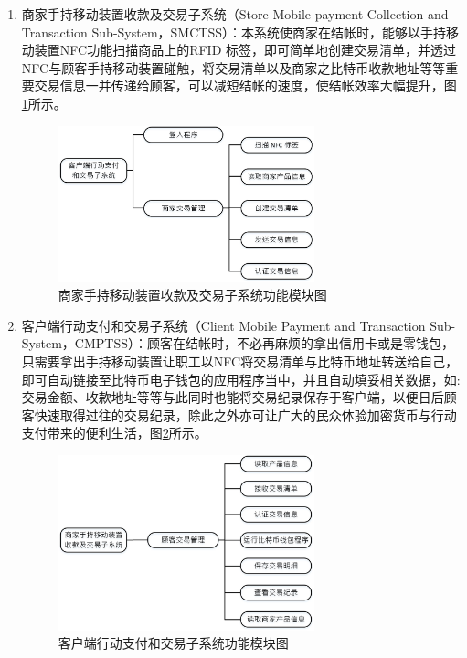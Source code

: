 \begin{enumerate}
		\item 商家手持移动装置收款及交易子系统（Store Mobile payment Collection and Transaction Sub-System，SMCTSS）：本系统使商家在结帐时，能够以手持移动装置NFC功能扫描商品上的RFID 标签，即可简单地创建交易清单，并透过NFC与顾客手持移动装置碰触，将交易清单以及商家之比特币收款地址等等重要交易信息一并传递给顾客，可以减短结帐的速度，使结帐效率大幅提升，图\ref{model3}所示。
		 
			\begin{figure}[!htbp]
			\centering
			\includegraphics[width = 0.7\textwidth]{model3.jpg}
			\caption{商家手持移动装置收款及交易子系统功能模块图}\label{model3}
			\end{figure}


		\item 客户端行动支付和交易子系统（Client Mobile Payment and Transaction Sub-System，CMPTSS）：顾客在结帐时，不必再麻烦的拿出信用卡或是零钱包，只需要拿出手持移动装置让职工以NFC将交易清单与比特币地址转送给自己，即可自动链接至比特币电子钱包的应用程序当中，并且自动填妥相关数据，如:交易金额、收款地址等等与此同时也能将交易纪录保存于客户端，以便日后顾客快速取得过往的交易纪录，除此之外亦可让广大的民众体验加密货币与行动支付带来的便利生活，图\ref{model2}所示。
			\begin{figure}[!htbp]
			\centering
			\includegraphics[width = 0.7\textwidth]{model2.jpg}
			\caption{客户端行动支付和交易子系统功能模块图}\label{model2}
			\end{figure}
		
	\end{enumerate}
	

